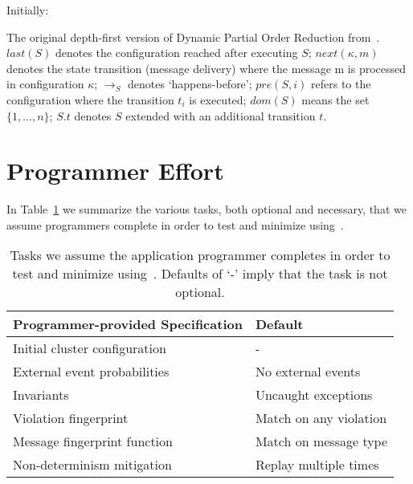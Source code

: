 \begin{algorithm*}[tb!]
\begin{algorithmic}
\State Initially: 
\Else
{}
\EndIf
\EndIf
\EndFor

\EndWhile
\EndIf

\EndProcedure
\end{algorithmic}
\caption{{\footnotesize \label{alg:dpor} The original depth-first version of Dynamic Partial Order Reduction
from~\cite{flanagan2005dynamic}. $last(S)$ denotes the configuration reached
after executing $S$;
$next(\kappa,m)$ denotes the state transition (message delivery) where the message m is
processed in configuration $\kappa$; $\rightarrow_S$ denotes `happens-before';
$pre(S,i)$ refers to the configuration where the transition $t_i$ is executed; $dom(S)$ means the set
$\{1,\dots,n\}$; $S.t$ denotes
$S$ extended with an additional transition $t$.}}
\end{algorithm*}

\section{Programmer Effort}
\label{app:programmer_effort}

In Table~\ref{tab:programmer_tasks} we summarize the various tasks, both
optional and necessary, that we assume programmers
complete in order to test and minimize using~\sys.

\begin{table}[tb]
\centering
\footnotesize
\begin{tabular}{l|l}
\textbf{Programmer-provided Specification} & \textbf{Default} \\
\hline
Initial cluster configuration & - \\
External event probabilities & No external events \\
Invariants & Uncaught exceptions \\
Violation fingerprint & Match on any violation \\
Message fingerprint function & Match on message type \\
Non-determinism mitigation & Replay multiple times
\end{tabular}
\caption[]{\label{tab:programmer_tasks} Tasks we assume the application
programmer completes in order to test and minimize using~\sys. Defaults
of `-' imply that the task is not optional.}
\end{table}


